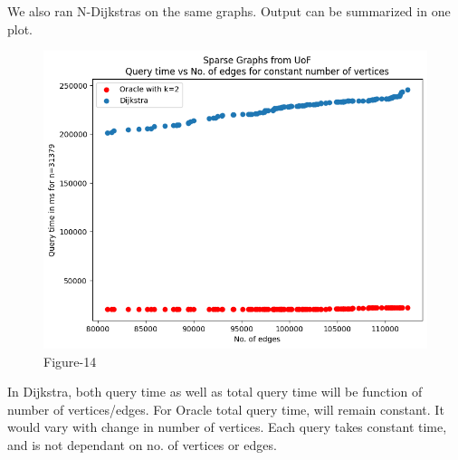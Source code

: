 \documentclass[12pt, a4paper]{article}
\begin{document}
We also ran N-Dijkstras on the same graphs. Output can be summarized in one plot.
\begin{figure}[H]
    \caption*{Figure-14}    
        \centering
    \includegraphics[scale=0.7]{./sparse/7}
    \end{figure}
    In Dijkstra, both query time as well as total query time will be function of number of vertices/edges. For Oracle total query time, will remain constant. It would vary with change in number of vertices. Each query takes constant time, and is not dependant on no. of vertices or edges. 
    \printbibliography
\end{document}
